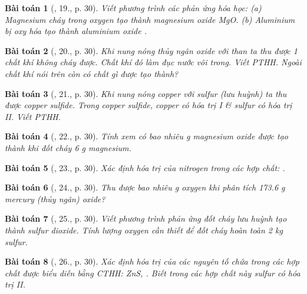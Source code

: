 \documentclass{article}
\newtheorem{baitoan}{Bài toán}
\begin{document}
\begin{baitoan}[\cite{An_Hoa_Hoc_nang_cao_8_9}, 19., p. 30]
	Viết phương trình các phản ứng hóa học: (a) Magnesium cháy trong oxygen tạo thành magnesium oxide {\rm MgO}. (b) Aluminium bị oxy hóa tạo thành aluminium oxide {\rm{}}.
\end{baitoan}

\begin{baitoan}[\cite{An_Hoa_Hoc_nang_cao_8_9}, 20., p. 30]
	Khi nung nóng thủy ngân oxide với than ta thu được 1 chất khí không cháy được. Chất khí đó làm đục nước vôi trong. Viết {\rm PTHH}. Ngoài chất khí nói trên còn có chất gì được tạo thành?
\end{baitoan}

\begin{baitoan}[\cite{An_Hoa_Hoc_nang_cao_8_9}, 21., p. 30]
	Khi nung nóng copper với sulfur (lưu huỳnh) ta thu được copper sulfide. Trong copper sulfide, copper có hóa trị I \& sulfur có hóa trị II. Viết {\rm PTHH}.
\end{baitoan}

\begin{baitoan}[\cite{An_Hoa_Hoc_nang_cao_8_9}, 22., p. 30]
	Tính xem có bao nhiêu {\rm g} magnesium oxide được tạo thành khi đốt cháy {\rm6 g} magnesium.
\end{baitoan}

\begin{baitoan}[\cite{An_Hoa_Hoc_nang_cao_8_9}, 23., p. 30]
	Xác định hóa trị của nitrogen trong các hợp chất: {\rm{}}.
\end{baitoan}

\begin{baitoan}[\cite{An_Hoa_Hoc_nang_cao_8_9}, 24., p. 30]
	Thu được bao nhiêu {\rm g} oxygen khi phân tích {173.6 g} mercury (thủy ngân) oxide?
\end{baitoan}

\begin{baitoan}[\cite{An_Hoa_Hoc_nang_cao_8_9}, 25., p. 30]
	Viết phương trình phản ứng đốt cháy lưu huỳnh tạo thành sulfur dioxide. Tính lượng oxygen cần thiết để đốt cháy hoàn toàn {\rm2 kg} sulfur.
\end{baitoan}

\begin{baitoan}[\cite{An_Hoa_Hoc_nang_cao_8_9}, 26., p. 30]
	Xác định hóa trị của các nguyên tố chứa trong các hợp chất được biểu diễn bằng {\rm CTHH}: {\rm ZnS, }. Biết trong các hợp chất này sulfur có hóa trị II.
\end{baitoan}
\end{document}
